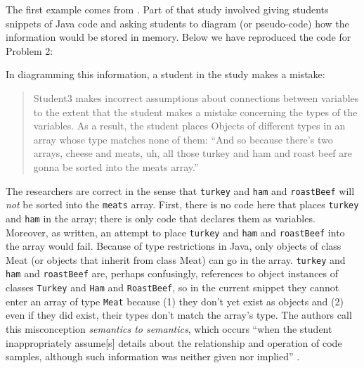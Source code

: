 The first example comes from \cite{kaczmarczyk_identifying_2010}. Part of that
study involved giving students snippets of Java code and asking students
to diagram (or pseudo-code) how the information would be stored in
memory. Below we have reproduced the code for Problem 2:

\hypertarget{sandiwches-code}{\label{sandwiches-code}}
\begin{Shaded}
\begin{Highlighting}[numbers=left,,]
 \NormalTok{Cheese[}\NormalTok{];}
 \NormalTok{Meat[}\NormalTok{];}
 \NormalTok{;}
 \NormalTok{;}
 \NormalTok{();}
 
 
\end{Highlighting}
\end{Shaded}

In diagramming this information, a student in the study makes a mistake:

\begin{quote}
  Student3 makes incorrect assumptions about connections between variables
  to the extent that the student makes a mistake concerning the types of
  the variables. As a result, the student places Objects of different
  types in an array whose type matches none of them: ``And so because
  there's two arrays, cheese and meats, uh, all those turkey and ham and
  roast beef are gonna be sorted into the meats array.'' \cite{kaczmarczyk_identifying_2010}
\end{quote}

The researchers are correct in the sense that \texttt{turkey} and
\texttt{ham} and \texttt{roastBeef} will \emph{not} be sorted into the
\texttt{meats} array. First, there is no code here that places
\texttt{turkey} and \texttt{ham} in the array; there is only code that
declares them as variables. Moreover, as written, an attempt to place
\texttt{turkey} and \texttt{ham} and \texttt{roastBeef} into the array
would fail. Because of type restrictions in Java, only objects of class
Meat (or objects that inherit from class Meat) can go in the array.
\texttt{turkey} and \texttt{ham} and \texttt{roastBeef} are, perhaps
confusingly, references to object instances of classes \texttt{Turkey}
and \texttt{Ham} and \texttt{RoastBeef}, so in the current snippet they
cannot enter an array of type \texttt{Meat} because (1) they don't yet
exist as objects and (2) even if they did exist, their types don't match
the array's type. The authors call this misconception \emph{semantics to
semantics}, which occurs ``when the student inappropriately
assume{[}s{]} details about the relationship and operation of code
samples, although such information was neither given nor implied''
\cite{kaczmarczyk_identifying_2010}.

